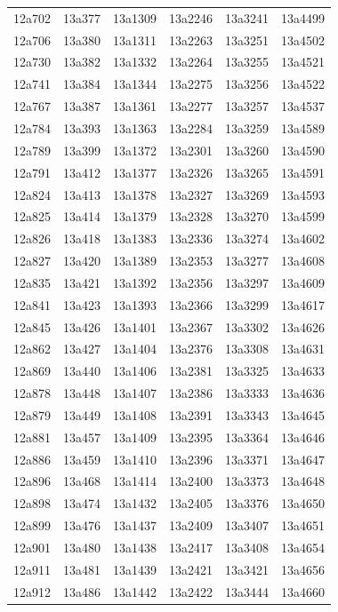 \documentclass[12pt, oneside]{amsart}
\begin{document}
{\begin{longtable}{*{6}{>{\raggedright\arraybackslash}p{}}}
12a702 & 13a377 & 13a1309 & 13a2246 & 13a3241 & 13a4499 \\
12a706 & 13a380 & 13a1311 & 13a2263 & 13a3251 & 13a4502 \\
12a730 & 13a382 & 13a1332 & 13a2264 & 13a3255 & 13a4521 \\
12a741 & 13a384 & 13a1344 & 13a2275 & 13a3256 & 13a4522 \\
12a767 & 13a387 & 13a1361 & 13a2277 & 13a3257 & 13a4537 \\
12a784 & 13a393 & 13a1363 & 13a2284 & 13a3259 & 13a4589 \\
12a789 & 13a399 & 13a1372 & 13a2301 & 13a3260 & 13a4590 \\
12a791 & 13a412 & 13a1377 & 13a2326 & 13a3265 & 13a4591 \\
12a824 & 13a413 & 13a1378 & 13a2327 & 13a3269 & 13a4593 \\
12a825 & 13a414 & 13a1379 & 13a2328 & 13a3270 & 13a4599 \\
12a826 & 13a418 & 13a1383 & 13a2336 & 13a3274 & 13a4602 \\
12a827 & 13a420 & 13a1389 & 13a2353 & 13a3277 & 13a4608 \\
12a835 & 13a421 & 13a1392 & 13a2356 & 13a3297 & 13a4609 \\
12a841 & 13a423 & 13a1393 & 13a2366 & 13a3299 & 13a4617 \\
12a845 & 13a426 & 13a1401 & 13a2367 & 13a3302 & 13a4626 \\
12a862 & 13a427 & 13a1404 & 13a2376 & 13a3308 & 13a4631 \\
12a869 & 13a440 & 13a1406 & 13a2381 & 13a3325 & 13a4633 \\
12a878 & 13a448 & 13a1407 & 13a2386 & 13a3333 & 13a4636 \\
12a879 & 13a449 & 13a1408 & 13a2391 & 13a3343 & 13a4645 \\
12a881 & 13a457 & 13a1409 & 13a2395 & 13a3364 & 13a4646 \\
12a886 & 13a459 & 13a1410 & 13a2396 & 13a3371 & 13a4647 \\
12a896 & 13a468 & 13a1414 & 13a2400 & 13a3373 & 13a4648 \\
12a898 & 13a474 & 13a1432 & 13a2405 & 13a3376 & 13a4650 \\
12a899 & 13a476 & 13a1437 & 13a2409 & 13a3407 & 13a4651 \\
12a901 & 13a480 & 13a1438 & 13a2417 & 13a3408 & 13a4654 \\
12a911 & 13a481 & 13a1439 & 13a2421 & 13a3421 & 13a4656 \\
12a912 & 13a486 & 13a1442 & 13a2422 & 13a3444 & 13a4660 \\

\end{longtable}}
\end{document}
